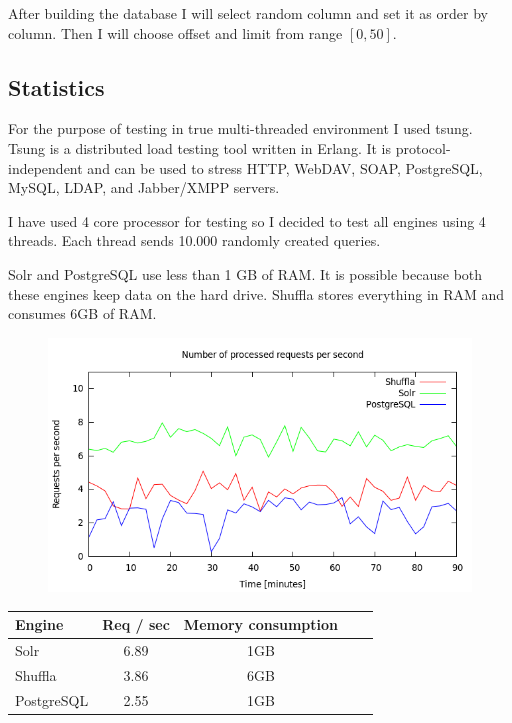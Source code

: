 \documentclass[10pt,a4paper]{article}
\begin{document}
After building the database I will select random column and set it as order by column. Then I will choose offset and limit from range $[0, 50]$.

\subsection{Statistics}

For the purpose of testing in true multi-threaded environment I used tsung. Tsung is a distributed load testing tool written in Erlang. It is protocol-independent and can be used to stress HTTP, WebDAV, SOAP, PostgreSQL, MySQL, LDAP, and Jabber/XMPP servers. 

I have used 4 core processor for testing so I decided to test all engines using 4 threads. Each thread sends 10.000 randomly created queries. 

Solr and PostgreSQL use less than 1 GB of RAM. It is possible because both these engines keep data on the hard drive. Shuffla stores everything in RAM and consumes 6GB of RAM. 

\begin{figure}[!ht]
\centering
  \includegraphics[width=12cm]{request_count_tn}
  \label{fig:request_count_tn}
\end{figure}

\begin{center}
\begin{tabular}{|l|c|c|c|c|}
\hline Engine & Req / sec & Memory consumption \\
\hline Solr & 6.89 & 1GB \\
\hline Shuffla & 3.86 & 6GB  \\
\hline PostgreSQL & 2.55 & 1GB \\
\hline 
\end{tabular}
\end{center}
\end{document}
